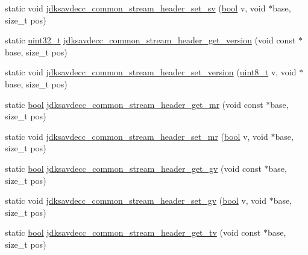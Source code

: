 \begin{DoxyCompactItemize}
\item 
static void \hyperlink{group__jdksavdecc__avtp__common__stream__header_ga39d3ca6060680d2203b60f4fb7decf95}{jdksavdecc\+\_\+common\+\_\+stream\+\_\+header\+\_\+set\+\_\+sv} (\hyperlink{avb__gptp_8h_af6a258d8f3ee5206d682d799316314b1}{bool} v, void $\ast$base, size\+\_\+t pos)
\item 
static \hyperlink{parse_8c_a6eb1e68cc391dd753bc8ce896dbb8315}{uint32\+\_\+t} \hyperlink{group__jdksavdecc__avtp__common__stream__header_ga7278cff4c0973c82c27f2521c3f9b3f1}{jdksavdecc\+\_\+common\+\_\+stream\+\_\+header\+\_\+get\+\_\+version} (void const $\ast$base, size\+\_\+t pos)
\item 
static void \hyperlink{group__jdksavdecc__avtp__common__stream__header_gaeccdba22e841696fde81420c4869f8a6}{jdksavdecc\+\_\+common\+\_\+stream\+\_\+header\+\_\+set\+\_\+version} (\hyperlink{stdint_8h_aba7bc1797add20fe3efdf37ced1182c5}{uint8\+\_\+t} v, void $\ast$base, size\+\_\+t pos)
\item 
static \hyperlink{avb__gptp_8h_af6a258d8f3ee5206d682d799316314b1}{bool} \hyperlink{group__jdksavdecc__avtp__common__stream__header_ga1078bf7435e2f2d588ff62763fb2253d}{jdksavdecc\+\_\+common\+\_\+stream\+\_\+header\+\_\+get\+\_\+mr} (void const $\ast$base, size\+\_\+t pos)
\item 
static void \hyperlink{group__jdksavdecc__avtp__common__stream__header_ga0a23937d901291741d558238cf923392}{jdksavdecc\+\_\+common\+\_\+stream\+\_\+header\+\_\+set\+\_\+mr} (\hyperlink{avb__gptp_8h_af6a258d8f3ee5206d682d799316314b1}{bool} v, void $\ast$base, size\+\_\+t pos)
\item 
static \hyperlink{avb__gptp_8h_af6a258d8f3ee5206d682d799316314b1}{bool} \hyperlink{group__jdksavdecc__avtp__common__stream__header_gaa6e6902759830178dd869a3ea8d16202}{jdksavdecc\+\_\+common\+\_\+stream\+\_\+header\+\_\+get\+\_\+gv} (void const $\ast$base, size\+\_\+t pos)
\item 
static void \hyperlink{group__jdksavdecc__avtp__common__stream__header_ga5d8f1b192e4fc1a6d2a762310c8b70cf}{jdksavdecc\+\_\+common\+\_\+stream\+\_\+header\+\_\+set\+\_\+gv} (\hyperlink{avb__gptp_8h_af6a258d8f3ee5206d682d799316314b1}{bool} v, void $\ast$base, size\+\_\+t pos)
\item 
static \hyperlink{avb__gptp_8h_af6a258d8f3ee5206d682d799316314b1}{bool} \hyperlink{group__jdksavdecc__avtp__common__stream__header_gae93f42ff954571137306bc5d7347b087}{jdksavdecc\+\_\+common\+\_\+stream\+\_\+header\+\_\+get\+\_\+tv} (void const $\ast$base, size\+\_\+t pos)
\item 

\end{DoxyCompactItemize}
